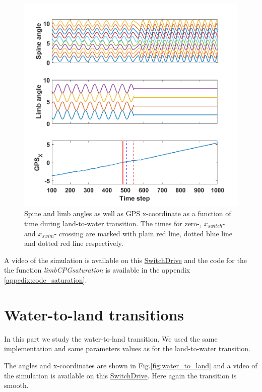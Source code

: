 \documentclass[a4paper]{scrartcl}
\begin{document}
{\begin{figure}
	\centering
	\includegraphics[width=\linewidth]{Figures/land_water_angles.png}
	\caption{\label{fig:land_to_water}Spine and limb angles as well as GPS x-coordinate as a function of time during land-to-water transition. The times for zero-, $x_{switch}$- and $x_{swim}$- crossing are marked with plain red line, dotted blue line and dotted red line respectively.}
\end{figure} 

A video of the simulation is available on this \href{https://drive.switch.ch/index.php/s/9Rfjdp8Z16rn1Pc}{SwitchDrive} and the code for the the function \textit{limbCPGsaturation} is available in the appendix \ref{appedix:code_saturation}. 

\section{Water-to-land transitions}
In this part we study the water-to-land transition. We used the same implementation and same parameters values as for the land-to-water transition.

The angles and x-coordinates are shown in Fig.\ref{fig:water_to_land} and a video of the simulation is available on this \href{https://drive.switch.ch/index.php/s/9Rfjdp8Z16rn1Pc}{SwitchDrive}. Here again the transition is smooth.

}
\end{document}
